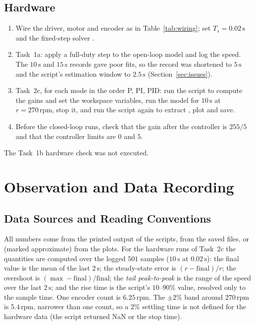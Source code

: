 \documentclass[lettersize,journal]{IEEEtran}
\newcommand{\code}[1]{\texttt{\detokenize{#1}}}
\newcommand{\Ts}{T_{\!s}}
\newcommand{\rpm}{\,\text{rpm}}
\begin{document}
\subsection{Hardware}
\begin{enumerate}
\item Wire the driver, motor and encoder as in Table~\ref{tab:wiring}; set $\Ts=0.02\,\text{s}$ and the fixed-step solver \code{ode1}.
\item Task~1a: apply a full-duty step to the open-loop model and log the speed. The $10\,\text{s}$ and $15\,\text{s}$ records gave poor fits, so the record was shortened to $5\,\text{s}$ and the script's estimation window to $2.5\,\text{s}$ (Section~\ref{sec:issues}).
\item Task~2c, for each mode in the order P, PI, PID: run the script to compute the gains and set the workspace variables, run the model for $10\,\text{s}$ at $r=270\rpm$, stop it, and run the script again to extract \code{hw_data}, plot and save.
\item Before the closed-loop runs, check that the gain after the controller is $255/5$ and that the controller limits are $0$ and $5$.
\end{enumerate}
The Task~1b hardware check was not executed.

\section{Observation and Data Recording}

\subsection{Data Sources and Reading Conventions}
All numbers come from the printed output of the scripts, from the saved \code{.mat} files, or (marked approximate) from the plots. For the hardware runs of Task~2c the quantities are computed over the logged $501$ samples ($10\,\text{s}$ at $0.02\,\text{s}$): the final value is the mean of the last $2\,\text{s}$; the steady-state error is $(r-\text{final})/r$; the overshoot is $(\max-\text{final})/\text{final}$; the \emph{tail peak-to-peak} is the range of the speed over the last $2\,\text{s}$; and the rise time is the script's $10$--$90\%$ value, resolved only to the sample time. One encoder count is $6.25\rpm$. The $\pm2\%$ band around $270\rpm$ is $5.4\rpm$, narrower than one count, so a $2\%$ settling time is not defined for the hardware data (the script returned NaN or the stop time).
\end{document}
